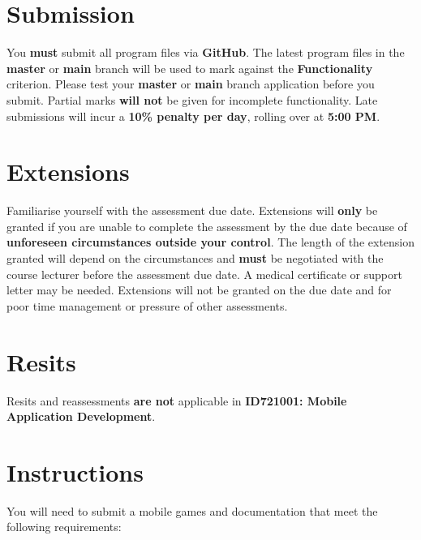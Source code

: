 \documentclass{article}
\begin{document}
\section*{Submission}
You \textbf{must} submit all program files via \textbf{GitHub}. The latest program files in the \textbf{master} or \textbf{main} branch will be used to mark against the \textbf{Functionality} criterion. Please test your \textbf{master} or \textbf{main} branch application before you submit. Partial marks \textbf{will not} be given for incomplete functionality. Late submissions will incur a \textbf{10\% penalty per day}, rolling over at \textbf{5:00 PM}.

\section*{Extensions}
Familiarise yourself with the assessment due date. Extensions will \textbf{only} be granted if you are unable to complete the assessment by the due date because of \textbf{unforeseen circumstances outside your control}. The length of the extension granted will depend on the circumstances and \textbf{must} be negotiated with the course lecturer before the assessment due date. A medical certificate or support letter may be needed. Extensions will not be granted on the due date and for poor time management or pressure of other assessments.

\section*{Resits}
Resits and reassessments \textbf{are not} applicable in \textbf{ID721001: Mobile Application Development}.

\section*{Instructions}
You will need to submit a mobile games and documentation that meet the following requirements:
\end{document}

